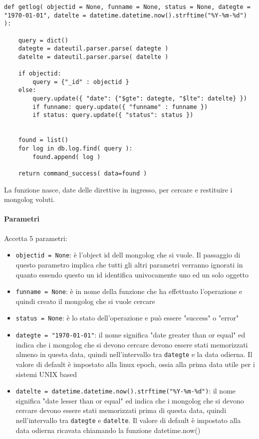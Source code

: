 \documentclass[11pt]{article}
\begin{document}
\subsubsection{}
\begin{lstlisting}
def getlog( objectid = None, funname = None, status = None, dategte = "1970-01-01", datelte = datetime.datetime.now().strftime("%Y-%m-%d") ):

    query = dict()
    dategte = dateutil.parser.parse( dategte )
    datelte = dateutil.parser.parse( datelte )

    if objectid:
        query = {"_id" : objectid }
    else:
        query.update({ "date": {"$gte": dategte, "$lte": datelte} })
        if funname: query.update({ "funname" : funname })
        if status: query.update({ "status": status })


    found = list()
    for log in db.log.find( query ):
        found.append( log )

    return command_success( data=found )
\end{lstlisting}
La funzione nasce, date delle direttive in ingresso, per cercare e restituire i mongolog voluti.
\paragraph{Parametri}
Accetta 5 parametri:
\begin{itemize}
	\item{\texttt{objectid = None}: è l'object id dell mongolog che si vuole. Il passaggio di questo parametro implica che tutti gli altri
		parametri verranno ignorati in quanto essendo questo un id identifica univocamente uno ed un solo oggetto}
	\item{\texttt{funname = None}: è in nome della funzione che ha effettuato l'operazione e quindi creato il mongolog che si vuole cercare}
	\item{\texttt{status = None}: è lo stato dell'operazione e può essere "success" o "error"}
	\item{\texttt{dategte = "1970-01-01"}: il nome significa "date greater than or equal" ed indica che i mongolog che si devono cercare
		devono essere stati memorizzati almeno in questa data, quindi nell'intervallo tra \texttt{dategte} e la data odierna.
		Il valore di default è impostato alla linux epoch, ossia alla prima data utile per i sistemi UNIX based}
	\item{\texttt{datelte = datetime.datetime.now().strftime("\%Y-\%m-\%d")}: il nome significa "date lesser than or equal" ed indica
		che i mongolog che si devono cercare devono essere stati memorizzati prima di questa data,
		quindi nell'intervallo tra \texttt{dategte} e \texttt{datelte}. Il valore di default è impostato alla data odierna ricavata
		chiamando la funzione datetime.now()}
\end{itemize}
\end{document}
